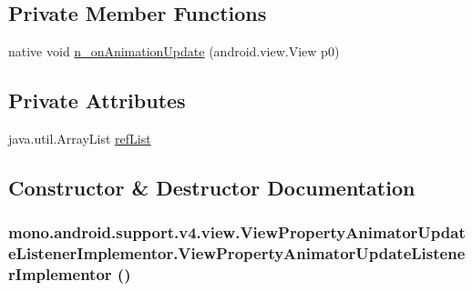 \subsection*{Private Member Functions}
\begin{CompactItemize}
\item 
native void \hyperlink{classmono_1_1android_1_1support_1_1v4_1_1view_1_1_view_property_animator_update_listener_implementor_54e0a1facc16d57398f85954783edd86}{n\_\-onAnimationUpdate} (android.view.View p0)
\end{CompactItemize}
\subsection*{Private Attributes}
\begin{CompactItemize}
\item 
java.util.ArrayList \hyperlink{classmono_1_1android_1_1support_1_1v4_1_1view_1_1_view_property_animator_update_listener_implementor_e0c31acb2dbcdd25358b4a588fbb3995}{refList}
\end{CompactItemize}


\subsection{Constructor \& Destructor Documentation}
\hypertarget{classmono_1_1android_1_1support_1_1v4_1_1view_1_1_view_property_animator_update_listener_implementor_39756d2d42f6d0bf89e519f0be482240}{
\subsubsection[{ViewPropertyAnimatorUpdateListenerImplementor}]{\setlength{\rightskip}{0pt plus 5cm}mono.android.support.v4.view.ViewPropertyAnimatorUpdateListenerImplementor.ViewPropertyAnimatorUpdateListenerImplementor ()}}
\label{classmono_1_1android_1_1support_1_1v4_1_1view_1_1_view_property_animator_update_listener_implementor_39756d2d42f6d0bf89e519f0be482240}




